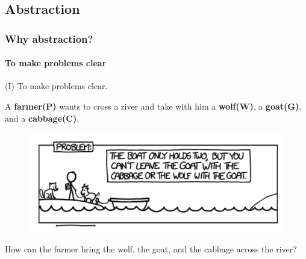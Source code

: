 \documentclass[11pt]{beamer}
\begin{document}
	\subsection{Abstraction}
	\begin{frame}
		\frametitle{Why abstraction?}
		\framesubtitle{To make problems clear}
		(I) To make problems clear. 
		\pause
		\begin{example}
			A \textbf{farmer(P)} wants to cross a river and take with him a \textbf{wolf(W)}, a \textbf{goat(G)}, and a \textbf{cabbage(C)}. 
			\pause

			\begin{figure}
				\includegraphics[scale=0.5]{prob.png}
			\end{figure}
			How can the farmer bring the wolf, the goat, and the cabbage across the river?
		\end{example}
	
	\end{frame}
\end{document}

